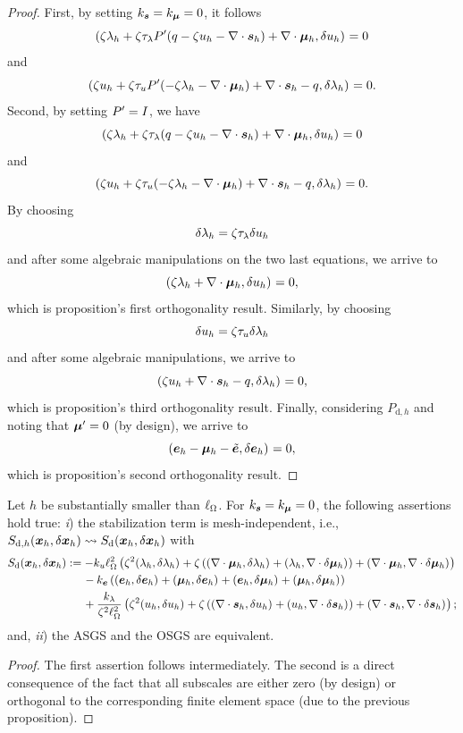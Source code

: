 \begin{proof}
First, by setting $\ks = \km = 0$, it follows
$$\iprod[]{\zeta\lFh+\zeta\tl\Pt(q-\zeta\uFh-\nabla\cdot \sFh)+\nabla\cdot\mFh}{\delta\uFh} = 0$$
and
$$\iprod[]{\zeta\uFh+\zeta\tu\Pt(-\zeta\lFh-\nabla\cdot\mFh)+\nabla\cdot\sFh-q}{\delta\lFh} = 0.$$
%
Second, by setting $\Pt = I$, we have
%
$$\iprod[]{\zeta\lFh+\zeta\tl(q-\zeta\uFh-\nabla\cdot\sFh)+\nabla\cdot\mFh}{\delta\uFh} = 0$$
and
$$\iprod[]{\zeta\uFh+\zeta\tu(-\zeta\lFh-\nabla\cdot\mFh)+\nabla\cdot\sFh-q}{\delta\lFh} = 0.$$
By choosing
$$\delta\lFh = \zeta\tl\delta\uFh$$
and after some algebraic manipulations on the two last equations, we arrive to
$$\iprod[]{\zeta\lFh+\nabla\cdot\mFh}{\delta\uFh} =  0,$$
which is proposition’s first orthogonality result.
Similarly, by choosing
$$\delta\uFh = \zeta\tu\delta\lFh$$
and after some algebraic manipulations, we arrive to
$$\iprod[]{\zeta\uFh+\nabla\cdot\sFh-q}{\delta\lFh} = 0,$$
which is proposition’s third orthogonality result. Finally, considering $P_{\mathrm{d},h}$ and noting that $\mF' = 0$ (by design), we arrive to
$$
\iprod[]{\eFh-\mFh-\eFt}{\delta\eFh}=0,$$
which is proposition's second orthogonality result.
\end{proof}
\begin{proposition}
Let $h$ be substantially smaller than $\length$. For $\ks=\km=0$, the following assertions hold true: \textit{i}) the stabilization term is mesh-independent, i.e., $\Sdh(\xFh,\delta\xFh)\leadsto\Sd(\xFh,\delta\xFh)$ with
\begin{align*}
\Sd(\xFh,\delta\xFh)
&:=-\ku \length^2\left(\zeta^2\iprod[]{\lFh}{\delta\lFh}+\zeta\left(\iprod[]{\nabla\cdot\mFh}{\delta\lFh}+\iprod[]{\lFh}{\nabla\cdot\delta\mFh}\right)+\iprod[]{\nabla\cdot\mFh}{\nabla\cdot\delta \mFh}\right)\\
&\quad\:\:-\ke\left(\iprod[]{\eFh}{\delta\eFh}+\iprod[]{\mFh}{\delta\eFh}+\iprod[]{\eFh}{\delta \mFh}+\iprod[]{\mFh}{\delta\mFh}\right)\\
&\quad\:\:+\frac{\kl}{\zeta^2\length^2}\left(\zeta^2\iprod[]{\uFh}{\delta\uFh}+\zeta\left(\iprod[]{\nabla\cdot\sFh}{\delta\uFh}+\iprod[]{\uFh}{\nabla\cdot\delta\sFh}\right)+\iprod[]{\nabla\cdot\sFh}{\nabla\cdot\delta \sFh}\right);
\end{align*}
and, \textit{ii}) the ASGS and the OSGS are equivalent.
\end{proposition}
\begin{proof}
    The first assertion follows intermediately. The second is a direct consequence of the fact that all subscales are either zero (by design) or orthogonal to the corresponding finite element space (due to the previous proposition).
\end{proof}